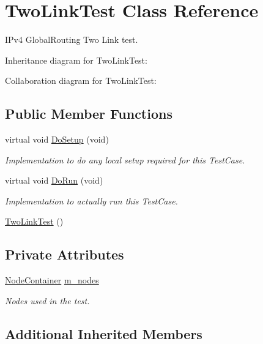 \hypertarget{classTwoLinkTest}{}\section{Two\+Link\+Test Class Reference}
\label{classTwoLinkTest}


I\+Pv4 Global\+Routing Two Link test.  




Inheritance diagram for Two\+Link\+Test\+:


Collaboration diagram for Two\+Link\+Test\+:
\subsection*{Public Member Functions}
\begin{DoxyCompactItemize}
\item 
virtual void \hyperlink{classTwoLinkTest_a5344eae56cf986eb8a7f571b05622e76}{Do\+Setup} (void)
\begin{DoxyCompactList}\small\item\em Implementation to do any local setup required for this Test\+Case. \end{DoxyCompactList}\item 
virtual void \hyperlink{classTwoLinkTest_a267222643b2048a903de0888b740440f}{Do\+Run} (void)
\begin{DoxyCompactList}\small\item\em Implementation to actually run this Test\+Case. \end{DoxyCompactList}\item 
\hyperlink{classTwoLinkTest_ab90d57568126c5fa72e094dd6cb43844}{Two\+Link\+Test} ()
\end{DoxyCompactItemize}
\subsection*{Private Attributes}
\begin{DoxyCompactItemize}
\item 
\hyperlink{classns3_1_1NodeContainer}{Node\+Container} \hyperlink{classTwoLinkTest_a535eefa99c2bbfc3103efa335fd96d76}{m\+\_\+nodes}
\begin{DoxyCompactList}\small\item\em Nodes used in the test. \end{DoxyCompactList}\end{DoxyCompactItemize}
\subsection*{Additional Inherited Members}


